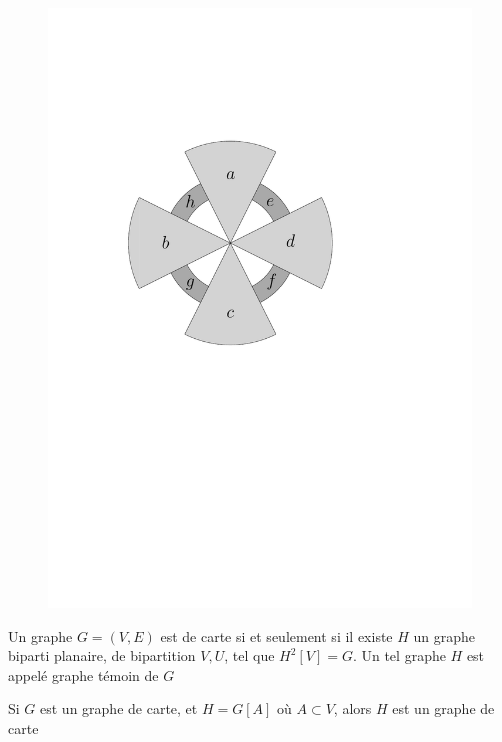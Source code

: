 \documentclass{scrartcl}
\begin{document}
\begin{flushleft}
\begin{figure}[h]
\begin{center}
    \0\0\0\0
    \includegraphics[page=\ipeFigexcarte, scale = 0.5]{figs}
    \end{center}
\end{figure}

\begin{theorem}\label{carCarte}
    Un graphe $G = (V, E)$ est de carte si et seulement si il existe $H$ un graphe biparti planaire, de bipartition $V, U$,
    tel que $H^2[V] = G$. Un tel graphe $H$ est appelé graphe témoin de $G$
\end{theorem}

\begin{prop}
    Si $G$ est un graphe de carte, et $H = G[A]$ où $A \subset V$, alors $H$ est un graphe de carte
\end{prop}


\end{flushleft}
\end{document}
